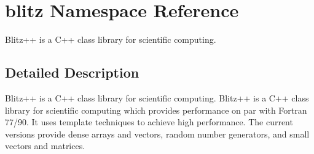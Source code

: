 \section{blitz \-Namespace \-Reference}
\label{namespaceblitz}


\-Blitz++ is a \-C++ class library for scientific computing.  




\subsection{\-Detailed \-Description}
\-Blitz++ is a \-C++ class library for scientific computing. \-Blitz++ is a \-C++ class library for scientific computing which provides performance on par with \-Fortran 77/90. \-It uses template techniques to achieve high performance. \-The current versions provide dense arrays and vectors, random number generators, and small vectors and matrices. 